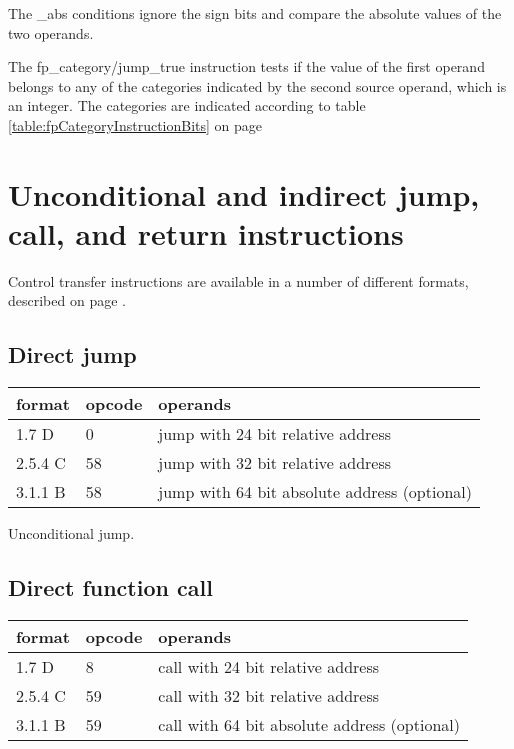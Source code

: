\documentclass[forwardcom.tex]{subfiles}
\begin{document}
The \_abs conditions ignore the sign bits and compare the absolute values of the two operands.
\vv

The fp\_category/jump\_true instruction tests if the value of the first operand belongs to any of the categories indicated by the second source operand, which is an integer. The categories are indicated according to table \ref{table:fpCategoryInstructionBits} on page \pageref{table:fpCategoryInstructionBits}
\vv


\section{Unconditional and indirect jump, call, and return instructions}
Control transfer instructions are available in a number of different formats, described on 
page \pageref{table:jumpInstructionFormats}.


\subsection{Direct jump}
\label{table:jumpInstruction}
\begin{tabular}{|p{14mm}|p{12mm}|p{110mm}|}
\hline
\bfseries format & \bfseries opcode & \bfseries operands \\ \hline
1.7 D &  0 & jump with 24 bit relative address \\ \hline
2.5.4 C & 58 & jump with 32 bit relative address \\ \hline
3.1.1 B & 58 & jump with 64 bit absolute address (optional) \\ \hline
\end{tabular}
\vv

Unconditional jump.


\subsection{Direct function call}
\label{table:callInstruction}
\begin{tabular}{|p{14mm}|p{12mm}|p{110mm}|}
\hline
\bfseries format & \bfseries opcode & \bfseries operands \\ \hline
1.7 D &  8 & call with 24 bit relative address \\ \hline
2.5.4 C & 59 & call with 32 bit relative address \\ \hline
3.1.1 B & 59 & call with 64 bit absolute address (optional) \\ \hline
\end{tabular}
\vv
\end{document}

